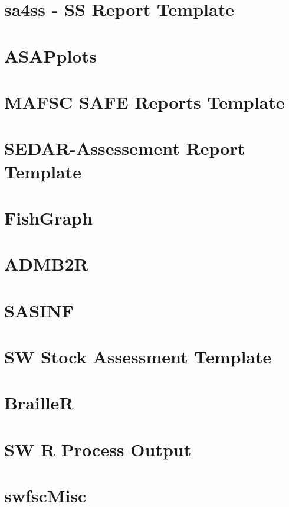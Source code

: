 \documentclass[
  letterpaper,
  DIV=11,
  numbers=noendperiod]{scrreprt}
\begin{document}
\section{sa4ss - SS Report Template}\label{sec-sa4ss}

\section{ASAPplots}\label{sec-asapplots}

\section{MAFSC SAFE Reports Template}\label{sec-mafscsafe}

\section{SEDAR-Assessement Report Template}\label{sec-sedartemplate}

\section{FishGraph}\label{sec-fishgraph}

\section{ADMB2R}\label{sec-admb2r}

\section{SASINF}\label{sec-sasinf}

\section{SW Stock Assessment Template}\label{sec-swfsctemplate}

\section{BrailleR}\label{sec-brailler}

\section{SW R Process Output}\label{sec-swroutput}

\section{swfscMisc}\label{sec-swfscmisc}
\end{document}
